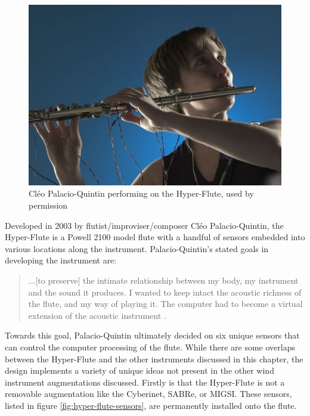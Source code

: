 \begin{figure}
    \centering
    \includegraphics[scale=0.5]{diagrams/palacio_quintin_cleo.jpg}
    \caption{Cléo Palacio-Quintin performing on the Hyper-Flute, used by permission} %
    \label{fig:hyper-flute}
\end{figure}

Developed in 2003 by flutist/improviser/composer Cléo Palacio-Quintin, the Hyper-Flute is a Powell 2100 model flute with a handful of sensors embedded into various locations along the instrument\cite{hyper-flute2003}. Palacio-Quintin's stated goals in developing the instrument are: 

\begin{quote}
    ...[to preserve] the intimate relationship between my body, my instrument and the sound it produces. I wanted to keep intact the acoustic richness of the flute, and my way of playing it. The computer had to become a virtual extension of the acoustic instrument \cite{hyper-flute2003}.
\end{quote}

Towards this goal, Palacio-Quintin ultimately decided on six unique sensors that can control the computer processing of the flute. While there are some overlaps between the Hyper-Flute and the other instruments discussed in this chapter, the design implements a variety of unique ideas not present in the other wind instrument augmentations discussed. Firstly is that the Hyper-Flute is not a removable augmentation like the Cyberinet, SABRe, or MIGSI. These sensors, listed in figure \ref{fig:hyper-flute-sensors}, are permanently installed onto the flute. 

